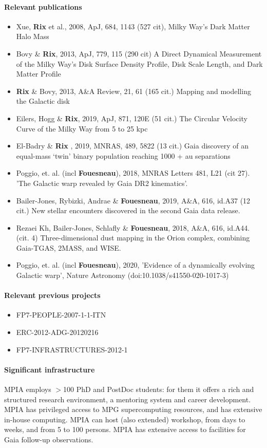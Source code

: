 \paragraph{Relevant publications}
\begin{itemize}
    \item Xue, \textbf{Rix} et al., 2008, ApJ, 684, 1143 (527 cit), Milky Way's Dark Matter Halo Mass
    \item Bovy \& \textbf{Rix}, 2013, ApJ, 779, 115 (290 cit) A Direct Dynamical Measurement of the Milky Way's Disk Surface Density Profile, Disk Scale Length, and Dark Matter Profile 
    \item \textbf{Rix} \& Bovy, 2013, A\&A Review, 21, 61 (165 cit.) Mapping and modelling the Galactic disk
    \item Eilers, Hogg \& \textbf{Rix}, 2019, ApJ, 871, 120E (51 cit.) The Circular Velocity Curve of the Milky Way from 5 to 25 kpc
    \item El-Badry \& \textbf{Rix} , 2019, MNRAS, 489, 5822 (13 cit.) Gaia discovery of an equal-mass `twin' binary population reaching 1000 + au separations
    \item Poggio, et. al. (incl \textbf{Fouesneau}), 2018, MNRAS Letters 481, L21 (cit 27). 'The Galactic warp revealed by Gaia DR2 kinematics'. 
    \item {{Bailer-Jones}, {Rybizki}, {Andrae} \&
         \textbf{Fouesneau}}, 2019, A\&A, 616, id.A37 (12 cit.) {New stellar encounters discovered in the second Gaia data release}.
    \item {Rezaei Kh, Bailer-Jones, Schlafly \& \textbf{Fouesneau}}, 2018, A\&A, 616, id.A44. (cit. 4) Three-dimensional dust mapping in the Orion complex, combining Gaia-TGAS, 2MASS, and WISE.
    \item Poggio, et. al. (incl \textbf{Fouesneau}), 2020, 'Evidence of a dynamically evolving Galactic warp', Nature Astronomy (doi:10.1038/s41550-020-1017-3)
    
\end{itemize}

\paragraph{Relevant previous projects}
\begin{itemize}
    \item FP7-PEOPLE-2007-1-1-ITN
    \item ERC-2012-ADG-20120216
    \item FP7-INFRASTRUCTURES-2012-1
\end{itemize}

\paragraph{Significant infrastructure}
MPIA employs $>$100 PhD and PostDoc students: for them it offers 
a rich and structured research environment, a mentoring system
and career development. MPIA has privileged access to MPG supercomputing resources,
and has extensive in-house computing. MPIA can host (also extended) workshop, from days to weeks, and from 5 to 100 persons. 
MPIA has extensive access to facilities for Gaia follow-up observations.
